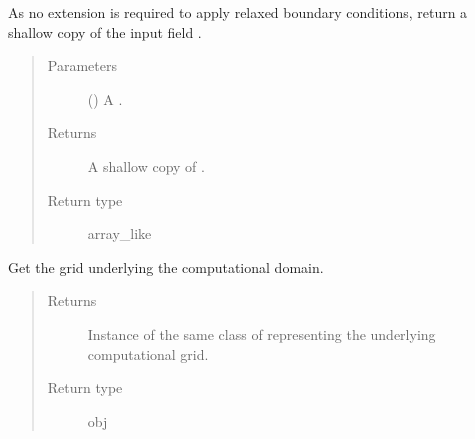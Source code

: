 \documentclass[letterpaper,10pt,english]{sphinxmanual}
\begin{document}
\begin{fulllineitems}
\begin{fulllineitems}
\label{\detokenize{api:dycore.horizontal_boundary_relaxed.Relaxed.from_physical_to_computational_domain}}
As no extension is required to apply relaxed boundary conditions, return a shallow copy of the
input field .
\begin{quote}\begin{description}
\item[{Parameters}] \leavevmode
{} () \textendash{} A .

\item[{Returns}] \leavevmode
A shallow copy of .

\item[{Return type}] \leavevmode
array\_like

\end{description}\end{quote}

\end{fulllineitems}


\begin{fulllineitems}
\label{\detokenize{api:dycore.horizontal_boundary_relaxed.Relaxed.get_computational_grid}}
Get the  grid underlying the computational domain.
\begin{quote}\begin{description}
\item[{Returns}] \leavevmode
Instance of the same class of 
representing the underlying computational grid.

\item[{Return type}] \leavevmode
obj

\end{description}\end{quote}

\end{fulllineitems}



\end{fulllineitems}
\end{document}
